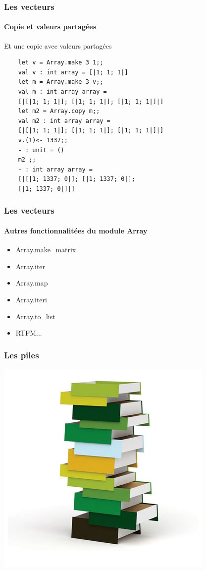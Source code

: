 \begin{frame}[fragile]
	\frametitle{Les vecteurs}
	\framesubtitle{Copie et valeurs partagées}
	\begin{block}{Et une copie avec valeurs partagées}
	\begin{lstlisting}
	let v = Array.make 3 1;;
	val v : int array = [|1; 1; 1|]
	let m = Array.make 3 v;;
	val m : int array array = 
	[|[|1; 1; 1|]; [|1; 1; 1|]; [|1; 1; 1|]|]
	let m2 = Array.copy m;;
	val m2 : int array array = 
	[|[|1; 1; 1|]; [|1; 1; 1|]; [|1; 1; 1|]|]
	v.(1)<- 1337;;
	- : unit = ()
	m2 ;;
	- : int array array = 
	[|[|1; 1337; 0|]; [|1; 1337; 0|]; 
	[|1; 1337; 0|]|]
	\end{lstlisting}
	\end{block}
\end{frame}


\begin{frame}[fragile]
	\frametitle{Les vecteurs}
	\framesubtitle{Autres fonctionnalitées du module Array}
	\begin{itemize}
	\item Array.make\_matrix
	
	\item Array.iter

	\item Array.map 

	\item Array.iteri

	\item Array.to\_list

	\item RTFM...

	\end{itemize}
\end{frame}


\begin{frame}
	\frametitle{Les piles}
	\includegraphics[scale=0.4]{pics/stack.jpg}
\end{frame}

